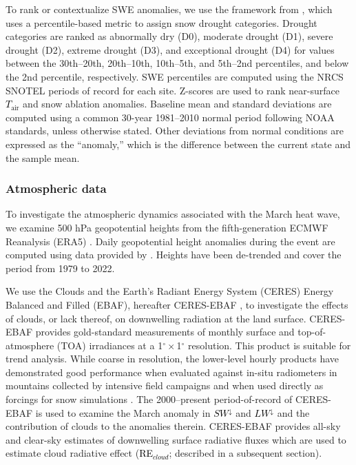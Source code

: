 \documentclass[draft]{agujournal2019}
\newcommand{\fig}[2]{\textcolor{black}{(Fig.~\ref{#1}{#2})}}   %
\newcommand{\tair}{\textcolor{black}{$T_{\mathrm{air}}$}\xspace}
\newcommand{\lwdn}{\textcolor{black}{$LW^{\downarrow}$}\xspace}
\newcommand{\swdn}{\textcolor{black}{$SW^{\downarrow}$}\xspace}
\newcommand{\rfcirrus}{\textcolor{black}{RE$_{cloud}$}\xspace}
\begin{document}
To rank or contextualize SWE anomalies, we use the framework from , which uses a percentile-based metric to assign snow drought categories.
Drought categories are ranked as abnormally dry (D0), moderate drought (D1), severe drought (D2), extreme drought (D3), and exceptional drought (D4) for values between the 30th--20th, 20th--10th, 10th--5th, and 5th--2nd percentiles, and below the 2nd percentile, respectively.
SWE percentiles are computed using the NRCS SNOTEL periods of record for each site.
Z-scores are used to rank near-surface \tair and snow ablation anomalies.
Baseline mean and standard deviations are computed using a common 30-year 1981--2010 normal period following NOAA standards, unless otherwise stated.
Other deviations from normal conditions are expressed as the ``anomaly,'' which is the difference between the current state and the sample mean.




\subsubsection{Atmospheric data}
To investigate the atmospheric dynamics associated with the March heat wave, we examine 500 hPa geopotential heights from the fifth-generation ECMWF Reanalysis (ERA5) \cite{Hersbach2020-era5}.
Daily geopotential height anomalies during the event are computed using data provided by .
Heights have been de-trended and cover the period from 1979 to 2022.

We use the Clouds and the Earth's Radiant Energy System (CERES) Energy Balanced and Filled (EBAF), hereafter CERES-EBAF \cite{Kato2018-pi}, to investigate the effects of clouds, or lack thereof, on downwelling radiation at the land surface. 
CERES-EBAF provides gold-standard measurements of monthly surface and top-of-atmosphere (TOA) irradiances at a 1$^\circ\times$1$^\circ$ resolution.
This product is suitable for trend analysis.
While coarse in resolution, the lower-level hourly products have demonstrated good performance when evaluated against in-situ radiometers in mountains collected by intensive field campaigns \cite{Rudisill2025-cx, Feldman2023-gp} and when used directly as forcings for snow simulations \cite{Hinkelman2015-ri}.
The 2000--present period-of-record of CERES-EBAF is used to examine the March anomaly in \swdn and \lwdn and the contribution of clouds to the anomalies therein.
CERES-EBAF provides all-sky and clear-sky estimates of downwelling surface radiative fluxes which are used to estimate cloud radiative effect (\rfcirrus; described in a subsequent section). 
\end{document}
